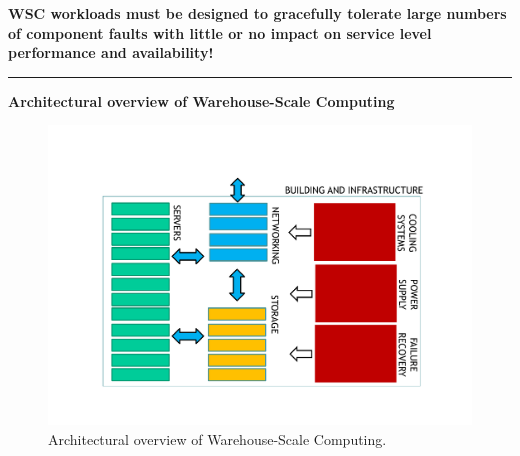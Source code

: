 \documentclass[a4paper]{article}
\newcommand{\longline}{\noindent\rule{\textwidth}{0.4pt}}
\newcommand{\highspace}{\vspace{1.2em}\noindent}
\begin{document}
    \highspace
    \textbf{WSC workloads must be designed to gracefully tolerate large numbers of component faults with little or no impact on service level performance and availability!}

    \hfill

    \longline

    \hfill

    \begin{center}
        \textcolor{Red2}{\textbf{Architectural overview of Warehouse-Scale Computing}}
    \end{center}

    \begin{figure}[!htp]
        \centering
        \includegraphics[width=\textwidth]{img/WSC-architecture-1.pdf}
        \caption{Architectural overview of Warehouse-Scale Computing.}
    \end{figure}

    \newpage
    
\end{document}
